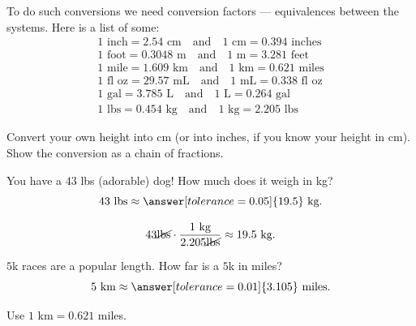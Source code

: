 \documentclass[12pt]{ximera}
\begin{document}
To do such conversions we need conversion factors --- equivalences between the
systems. Here is a list of some:
\[
\begin{array}{l}
1 \text{ inch} = 2.54 \text{ cm} \quad\text{and}\quad 1 \text{ cm} = 0.394 \text{ inches} \\
1 \text{ foot} = 0.3048 \text{ m} \quad\text{and}\quad 1 \text{ m} = 3.281 \text{ feet} \\
1 \text{ mile} = 1.609 \text{ km} \quad\text{and}\quad 1 \text{ km} = 0.621 \text{ miles} \\
1 \text{ fl oz} = 29.57 \text{ mL} \quad\text{and}\quad 1 \text{ mL} = 0.338 \text{ fl oz} \\
1 \text{ gal} = 3.785 \text{ L} \quad\text{and}\quad 1 \text{ L} = 0.264 \text{ gal} \\
1 \text{ lbs} = 0.454 \text{ kg} \quad\text{and}\quad 1 \text{ kg} = 2.205 \text{ lbs}
\end{array}
\]

\begin{problem}
Convert your own height into cm (or into inches, if you know your height in cm).
Show the conversion as a chain of fractions.

\begin{freeResponse}
\end{freeResponse}
\end{problem}

\begin{problem}
You have a $43$ lbs (adorable) dog! How much does it weigh in kg?
\[
43 \text{ lbs} \approx \answer[tolerance=0.05]{19.5} \text{ kg}.
\]

\begin{solution}
\[
43 \cancel{\text{lbs}} \cdot \frac{1 \text{ kg}}{2.205 \cancel{\text{lbs}}}
\approx 19.5 \text{ kg}.
\]
\end{solution}
\end{problem}

\begin{problem}
$5$k races are a popular length. How far is a $5$k in miles?
\[
5 \text{ km} \approx \answer[tolerance=0.01]{3.105} \text{ miles}.
\]

\begin{hint}
Use $1 \text{ km} = 0.621$ miles.
\end{hint}
\end{problem}
\end{document}
